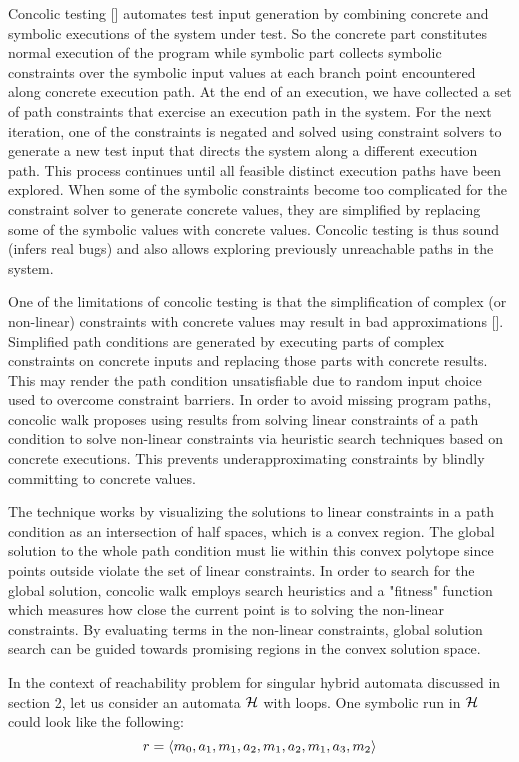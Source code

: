 Concolic testing [] automates test input generation by combining concrete and symbolic executions of the system under test. So the concrete part constitutes normal execution of the program while symbolic part collects symbolic constraints over the symbolic input values at each branch point encountered along concrete execution path. At the end of an execution, we have collected a set of path constraints that exercise an execution path in the system. For the next iteration, one of the constraints is negated and solved using constraint solvers to generate a new test input that directs the system along a different execution path. This process continues until all feasible distinct execution paths have been explored. When some of the symbolic constraints become too complicated for the constraint solver to generate concrete values, they are simplified by replacing some of the symbolic values with concrete values.
Concolic testing is thus sound (infers real bugs) and also allows exploring previously unreachable paths in the system. 

One of the limitations of concolic testing is that the simplification of complex (or non-linear) constraints with concrete values may result in bad approximations []. Simplified path conditions are generated by executing parts of complex constraints on concrete inputs and replacing those parts with concrete results. This may render the path condition unsatisfiable due to random input choice used to overcome constraint barriers. In order to avoid missing program paths, concolic walk proposes using results from solving linear constraints of a path condition to solve non-linear constraints via heuristic search techniques based on concrete executions. This prevents underapproximating constraints by blindly committing to concrete values. 

The technique works by visualizing the solutions to linear constraints in a path condition as an intersection of half spaces, which is a convex region. The global solution to the whole path condition must lie within this convex polytope since points outside violate the set of linear constraints. In order to search for the global solution, concolic walk employs search heuristics and a "fitness" function which measures how close the current point is to solving the non-linear constraints. By evaluating terms in the non-linear constraints, global solution search can be guided towards promising regions in the convex solution space.
 
In the context of reachability problem for singular hybrid automata discussed in section 2, let us consider an automata $\mathcal{H}$ with loops. One symbolic run in $\mathcal{H}$ could look like the following: 
\[
  r = \langle m_0, a_1, m_1, a_2, m_1, a_2, m_1, a_3, m_2 \rangle
\] 

